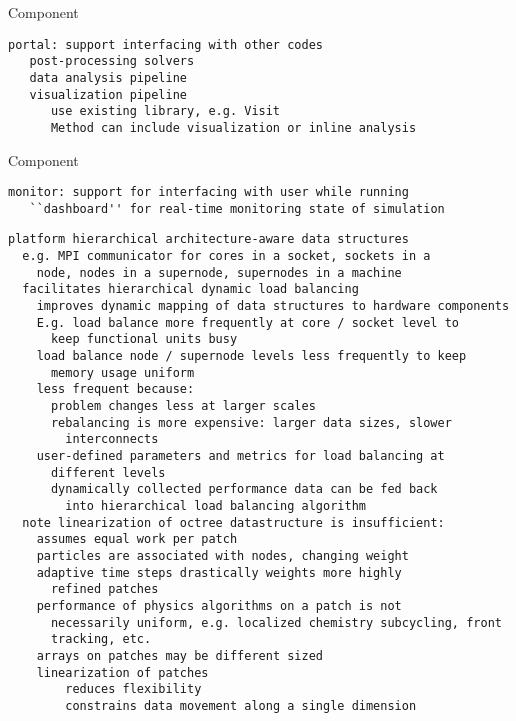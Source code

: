 \documentclass[10pt]{article}
\begin{document}
 Component

\begin{verbatim}
portal: support interfacing with other codes
   post-processing solvers
   data analysis pipeline
   visualization pipeline
      use existing library, e.g. Visit
      Method can include visualization or inline analysis
\end{verbatim}

 Component

\begin{verbatim}
monitor: support for interfacing with user while running
   ``dashboard'' for real-time monitoring state of simulation
\end{verbatim}




\begin{verbatim}
platform hierarchical architecture-aware data structures
  e.g. MPI communicator for cores in a socket, sockets in a
    node, nodes in a supernode, supernodes in a machine
  facilitates hierarchical dynamic load balancing
    improves dynamic mapping of data structures to hardware components
    E.g. load balance more frequently at core / socket level to
      keep functional units busy
    load balance node / supernode levels less frequently to keep
      memory usage uniform
    less frequent because:
      problem changes less at larger scales
      rebalancing is more expensive: larger data sizes, slower
        interconnects
    user-defined parameters and metrics for load balancing at
      different levels
      dynamically collected performance data can be fed back
        into hierarchical load balancing algorithm
  note linearization of octree datastructure is insufficient:
    assumes equal work per patch
    particles are associated with nodes, changing weight
    adaptive time steps drastically weights more highly
      refined patches
    performance of physics algorithms on a patch is not
      necessarily uniform, e.g. localized chemistry subcycling, front
      tracking, etc.
    arrays on patches may be different sized
    linearization of patches 
        reduces flexibility
        constrains data movement along a single dimension
\end{verbatim}
\end{document}
